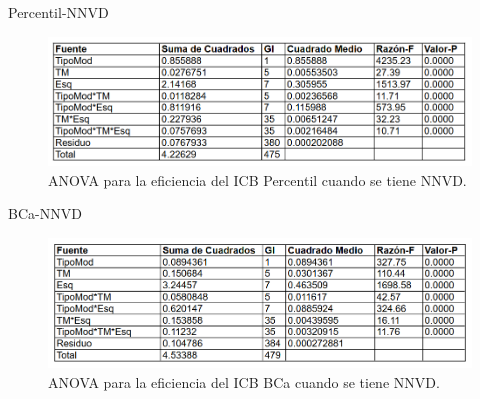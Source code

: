 
Percentil-NNVD

\begin{figure}[ht] 
	\centering 
	\includegraphics[width=0.95\linewidth]{img/ANOVA_Efic_ICB_Perc_NNVD.png} 
	\caption{ANOVA para la eficiencia del ICB Percentil cuando se tiene NNVD.} 
	\label{fig:ANOVA_Efic_ICB_Perc_NNVD}
\end{figure}
\FloatBarrier





BCa-NNVD

\begin{figure}[ht] 
	\centering 
	\includegraphics[width=0.95\linewidth]{img/ANOVA_Efic_ICB_BCa_NNVD.png} 
	\caption{ANOVA para la eficiencia del ICB BCa cuando se tiene NNVD.} 
	\label{fig:ANOVA_Efic_ICB_BCa_NNVD}
\end{figure}
\FloatBarrier
